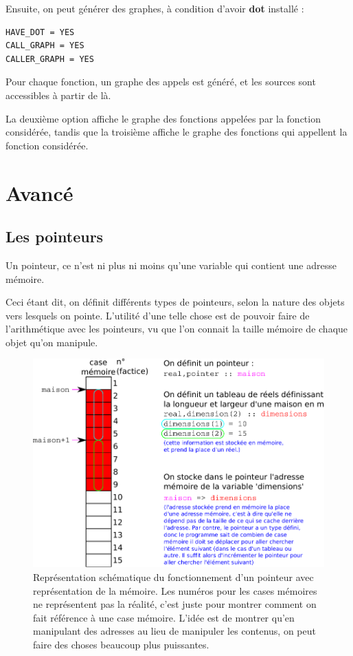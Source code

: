 \documentclass[a4paper,twoside]{article}
\begin{document}
Ensuite, on peut générer des graphes, à condition d'avoir \textbf{dot} installé : 
\begin{verbatim}
HAVE_DOT = YES
CALL_GRAPH = YES
CALLER_GRAPH = YES
\end{verbatim}
Pour chaque fonction, un graphe des appels est généré, et les sources sont accessibles à partir de là. 

La deuxième option affiche le graphe des fonctions appelées par la fonction considérée, tandis que la troisième affiche le graphe des fonctions qui appellent la fonction considérée.

\section{Avancé}
\subsection{Les pointeurs}
Un pointeur, ce n'est ni plus ni moins qu'une variable qui contient une adresse mémoire. 

Ceci étant dit, on définit différents types de pointeurs, selon la nature des objets vers lesquels on pointe. L'utilité d'une telle chose est de pouvoir faire de l'arithmétique avec les pointeurs, vu que l'on connait la taille mémoire de chaque objet qu'on manipule. 

\begin{figure}[htb]
\centering
\includegraphics[width=0.65\linewidth]{figure/pointeurs.pdf}
\caption{Représentation schématique du fonctionnement d'un pointeur avec représentation de la mémoire. Les numéros pour les cases mémoires ne représentent pas la réalité, c'est juste pour montrer comment on fait référence à une case mémoire. L'idée est de montrer qu'en manipulant des adresses au lieu de manipuler les contenus, on peut faire des choses beaucoup plus puissantes.}
\end{figure}
\end{document}
